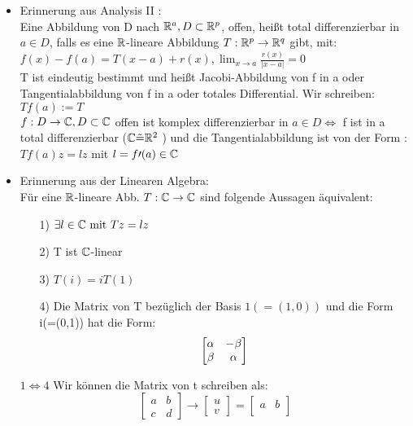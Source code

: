 \begin{bemerkung}\label{bemer}
	\leavevmode
	\begin{itemize}
		\item
		Erinnerung aus Analysis II :\\
		Eine Abbildung von D nach $\mathbb{R}^a, D \subset \mathbb{R}^p$, offen, heißt total
		differenzierbar in $a \in D$, falls es eine $\mathbb{R}$-lineare Abbildung 
		$T: \mathbb{R}^p \to \mathbb{R}^q$ gibt, mit:\\
		$f(x)-f(a) = T(x-a) +r(x), \lim_{x \to a} \frac{r(x)}{|x-a|}= 0$\\
		T ist eindeutig bestimmt und heißt Jacobi-Abbildung von f in a 
		oder Tangentialabbildung von f in a oder totales Differential. Wir 
		schreiben: \\
		$Tf(a) := T$ \\
		$ f: D \rightarrow \mathbb{C} , D \subset \mathbb{C} $ offen ist komplex differenzierbar in $a \in D \Leftrightarrow$ f ist in a total differenzierbar ($\mathbb{C} \tilde{=} \mathbb{R}^2$ ) und die Tangentialabbildung ist von der Form : $Tf(a)z = lz$ mit $l = f\prime(a) \in \mathbb{C}$ 
		\item
		Erinnerung aus der Linearen Algebra:\\
		Für eine $\mathbb{R}$-lineare Abb. $T: \mathbb{C} \to \mathbb{C}$ sind folgende Aussagen äquivalent:
		\begin{itemize}
			\item[1)]
			$\exists l \in \mathbb{C} \text{ mit } Tz = lz$
			\item[2)]
			T ist $\mathbb{C}$-linear
			\item[3)]
			$T(i) = iT(1)$
			\item[4)]
			Die Matrix von T bezüglich der Basis $1(=(1,0))$ und die Form \\
			i(=(0,1)) hat die Form:
			\[
			\begin{bmatrix}
			\alpha & -\beta\\
			\beta & \alpha
			\end{bmatrix}
			\]
		\end{itemize}
		\begin{bew}
			$1 \Leftrightarrow 4$ Wir können die Matrix von t schreiben als:
			\[ \begin{bmatrix}
			a & b \\
			c & d
			\end{bmatrix}
			\rightarrow \begin{bmatrix}
			u \\
			v
			\end{bmatrix} = 
			\begin{bmatrix}
			a & b \\

\end{bmatrix}\]
\end{bew}
\end{itemize}
\end{bemerkung}
